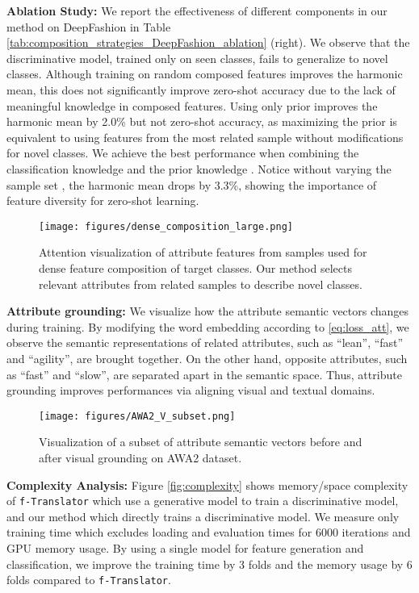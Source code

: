 \documentclass[10pt,journal,compsoc]{IEEEtran}
\newcommand{\1}{\boldsymbol{1}}
\newcommand{\0}{\boldsymbol{0}}
\newcommand{\<}{\langle}
\renewcommand{\>}{\rangle}
\newcommand{\myparagraph}[1]{\vspace{-2pt}\medskip\noindent\textbf{#1}}
\begin{document}
\myparagraph{Ablation Study:}
We report the effectiveness of different components in our method on DeepFashion in Table \ref{tab:composition_strategies_DeepFashion_ablation} (right). We observe that the discriminative model, trained only on seen classes, fails to generalize to novel classes. 
Although training on random composed features improves the harmonic mean, this does not significantly improve zero-shot accuracy due to the lack of meaningful knowledge in composed features. Using only prior  improves the harmonic mean by 2.0\% but not zero-shot accuracy, as maximizing the prior is equivalent to using features from the most related sample without modifications for novel classes.
We achieve the best performance when combining the classification knowledge  and the prior knowledge .
Notice without varying the sample set , the harmonic mean drops by 3.3\%, showing the importance of feature diversity for zero-shot learning.

\begin{figure*}[h]
\centering
\texttt{[image: figures/dense\_composition\_large.png]}
\vspace{-0mm}
\caption{
\small{Attention visualization of attribute features from samples used for dense feature composition of target classes. Our method selects relevant attributes from related samples to describe novel classes. 
}
}
\label{fig:dense_composition_samples}
\end{figure*}




\myparagraph{Attribute grounding:}
We visualize how the attribute semantic vectors changes during training.
By modifying the word embedding according to \eqref{eq:loss_att}, we observe the semantic representations of related attributes, such as ``lean'', ``fast'' and ``agility'', are brought together. On the other hand, opposite attributes, such as ``fast'' and ``slow'', are separated apart in the semantic space.
Thus, attribute grounding improves performances via aligning visual and textual domains.

\begin{figure}[h]
\centering
\texttt{[image: figures/AWA2\_V\_subset.png]}
\vspace{-0mm}
\caption{
\small{
Visualization of a subset of attribute semantic vectors before and after visual grounding on AWA2 dataset.
}
}
\label{fig:visual_grounding}
\end{figure}
\myparagraph{Complexity Analysis:}
Figure \ref{fig:complexity} shows memory/space complexity of \texttt{f-Translator} which use a generative model to train a discriminative model, and our method which directly trains a discriminative model. We measure only training time which excludes loading and evaluation times for 6000 iterations and GPU memory usage. By using a single model for feature generation and classification, we improve the training time by 3 folds and the memory usage by 6 folds compared to \texttt{f-Translator}.
\end{document}
